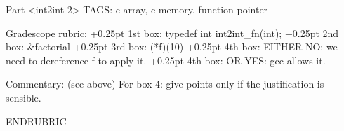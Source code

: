 \begin{framed}
\bigskip
{}
\end{framed}


\RUBRIC
Part <int2int-2>
TAGS: c-array, c-memory, function-pointer

Gradescope rubric:
+0.25pt 1st box: typedef int int2int_fn(int);
+0.25pt 2nd box: &factorial
+0.25pt 3rd box: (*f)(10)
+0.25pt 4th box: EITHER NO: we need to dereference f to apply it.
+0.25pt 4th box: OR     YES: gcc allows it.

Commentary: (see above)
For box 4: give points only if the justification is sensible.

ENDRUBRIC
